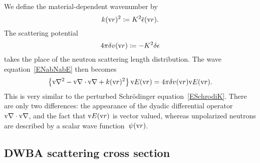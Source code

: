 %
%
We define the material-dependent wavenumber by
%
\begin{equation}
  k(\text{v}{r})^2 \coloneqq K^2 \overline{\epsilon}(\text{v}{r}).
\end{equation}
The scattering potential
%
\begin{equation}
  4\pi\delta v(\text{v}{r}) \coloneqq - K^2\delta\epsilon
\end{equation}
takes the place of the neutron scattering length distribution.
The wave equation~\cref{ENabNabE} then becomes
\begin{equation}\label{EwaveE3}
  \left\{\text{v}{\nabla}^2-\text{v}{\nabla}\cdot\text{v}{\nabla} + k(\text{v}{r})^2\right\}\text{v}{E}(\text{v}{r})
  = 4\pi\delta v(\text{v}{r})\text{v}{E}(\text{v}{r}).
\end{equation}
%
%
This is very similar to the perturbed Schrödinger equation~\cref{ESchrodiK}.
%
%
There are only two differences:
the appearance of the dyadic differential operator $\text{v}{\nabla}\cdot\text{v}{\nabla}$,
and the fact that $\text{v}{E}(\text{v}{r})$ is vector valued,
whereas unpolarized neutrons are described by a scalar wave function~$\psi(\text{v}{r})$.

\subsection{DWBA scattering cross section}\label{SXscasol}

\def\TD{\TENS{D}}
\def\TG{\TENS{G}}
\def\TDo{\TENS{\overset{o}{D}}}
\def\TGo{\TENS{\overset{o}{G}}}
\def\Ei{\v{E}_\si}
\def\Eic{\Ei^*}
\def\Ef{\v{E}_\sf}
\def\Efc{\Ef^*}
\def\Eo{\TENS{\overset{o}{\v{E}}}}
\def\Efo{\Eo_\sf}
\def\Efoc{\Eo\vphantom{E}^*_\sf}
\def\he{\v{\hat e}}
\def\hef{\he_\sf}
\def\hei{\he_\si}
\def\sif{\text{i,f}}


